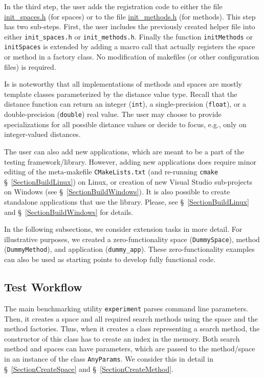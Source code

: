 \documentclass[runningheads,a4paper]{llncs}
\newcommand{\replocfile}{https://github.com/searchivarius/NonMetricSpaceLib/blob/pserv/}
\newcommand{\ttt}[1]{\texttt{#1}}
\begin{document}
In the third step, the user adds 
the registration code to either the file 
\href{\replocfile similarity_search/include/factory/init_spaces.h}{init\_spaces.h} (for spaces)
or to the file
\href{\replocfile similarity_search/include/factory/init_methods.h}{init\_methods.h} (for methods).
This step has two sub-steps. 
First, the user includes the previously created helper file into either
\ttt{init\_spaces.h} or \ttt{init\_methods.h}.
Finally the function \ttt{initMethods} or \ttt{initSpaces} is extended
by adding a macro call that actually registers the space or method in a factory class.
No modification of makefiles (or other configuration files) is required.

Is is noteworthy that all implementations of methods and spaces
are mostly template classes parameterized by the distance value type.
Recall that the distance function can return an integer (\ttt{int}), 
a single-precision (\ttt{float}), or a double-precision (\ttt{double}) real value.
The user may choose to provide specializations for all possible
distance values or decide to focus, e.g., only on integer-valued distances.

The user can also add new applications, which are meant to be 
a part of the testing framework/library.
However, adding new applications does require minor editing of the meta-makefile \ttt{CMakeLists.txt} 
(and re-running \ttt{cmake} \S~\ref{SectionBuildLinux}) on Linux,
or creation of new Visual Studio sub-projects on Windows (see \S~\ref{SectionBuildWindows}).
It is also possible to create standalone applications that use the library.
Please, see \S~\ref{SectionBuildLinux} and \S~\ref{SectionBuildWindows} for details.

In the following subsections, 
we consider extension tasks in more detail.
For illustrative purposes,
we created a zero-functionality space (\ttt{DummySpace}), 
method (\ttt{DummyMethod}), and application (\ttt{dummy\_app}).
These zero-functionality examples can also be used as starting points to develop fully functional code.

\subsection{Test Workflow}\label{SectionWorkflow}
The main benchmarking utility \ttt{experiment} parses command line parameters. 
Then, it creates a space and all required search methods using
the space and the method factories.
Thus, when it creates a class representing a search method,
the constructor of this class has to create an index in the memory.
Both search method and spaces can have parameters,
which are passed to the method/space in an instance
of the class \ttt{AnyParams}.
We consider this in detail in \S~\ref{SectionCreateSpace} and \S~\ref{SectionCreateMethod}.
\end{document}
